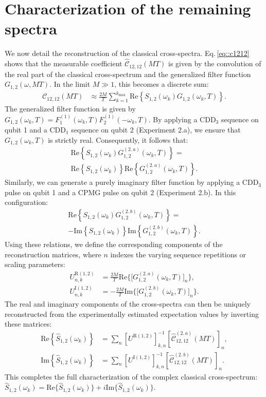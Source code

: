 \documentclass[%
 reprint,
superscriptaddress,
 amsmath,amssymb,
 aps,
pra,
floatfix,
]{revtex4-2}
\begin{document}
\section{Characterization of the remaining spectra}
\label{app::char}
We now detail the reconstruction of the classical cross-spectra. Eq.\,\eqref{eq::c1212} shows that the measurable coefficient $\hat{\mathcal{C}}_{12,12}(MT)$ is given by the convolution of the real part of the classical cross-spectrum and the generalized filter function $G_{1,2}(\omega, MT)$. In the limit $M\gg 1$, this becomes a discrete sum:
\begin{align}
    \mathcal{C}_{12,12}(MT)&\approx\frac{2M}{T}\sum_{k=1}^{k_{\max}}\text{Re}\left\{S_{1,2}(\omega_k)G_{1,2}(\omega_k, T)\right\}.
\end{align}
The generalized filter function is given by $G_{1,2}(\omega_k, T)=F_1^{(1)}(\omega_k, T)F_2^{(1)}(-\omega_k, T)$. By applying a $\text{CDD}_3$ sequence on qubit 1 and a $\text{CDD}_1$ sequence on qubit 2 (Experiment 2.a), we ensure that $G_{1,2}(\omega_k, T)$ is strictly real. Consequently, it follows that:
\begin{multline}
    \text{Re}\left\{S_{1,2}(\omega_k)G_{1,2}^{(2.\,a)}(\omega_k, T)\right\} = \\
    \text{Re}\left\{S_{1,2}(\omega_k)\right\}\text{Re}\left\{G_{1,2}^{(2.\,a)}(\omega_k, T)\right\}.
\end{multline}
Similarly, we can generate a purely imaginary filter function by applying a $\text{CDD}_3$ pulse on qubit 1 and a CPMG pulse on qubit 2 (Experiment 2.b). In this configuration:
\begin{multline}
    \text{Re}\left\{S_{1,2}(\omega_k)G_{1,2}^{(2.\,b)}(\omega_k, T)\right\} =\\
    -\text{Im}\left\{S_{1,2}(\omega_k)\right\}\text{Im}\left\{G_{1,2}^{(2.\,b)}(\omega_k, T)\right\}.
\end{multline}
Using these relations, we define the corresponding components of the reconstruction matrices, where $n$ indexes the varying sequence repetitions or scaling parameters:
\begin{align}
    U_{n,k}^{\text{R}(1,2)}&=\frac{2M}{T}\text{Re}\Big\{\big[G_{1,2}^{(2.\,a)}(\omega_k, T)\big]_n\Big\},\\
    U_{n,k}^{\text{I}(1,2)}&=-\frac{2M}{T}\text{Im}\Big\{\big[G_{1,2}^{(2.\,b)}(\omega_k, T)\big]_n\Big\}.
\end{align}
The real and imaginary components of the cross-spectra can then be uniquely reconstructed from the experimentally estimated expectation values by inverting these matrices:
\begin{align}
    \text{Re}\left\{\hat{S}_{1,2}(\omega_k)\right\} &= \sum_n\left[U^{\text{R}(1,2)}\right]^{-1}_{k,n}\left[\hat{\mathcal{C}}^{(2.\,a)}_{12,12}(MT)\right]_n,\\
    \text{Im}\left\{\hat{S}_{1,2}(\omega_k)\right\} &= \sum_n\left[U^{\text{I}(1,2)}\right]^{-1}_{k,n}\left[\hat{\mathcal{C}}^{(2.\,b)}_{12,12}(MT)\right]_n.
\end{align}
This completes the full characterization of the complex classical cross-spectrum: $\hat{S}_{1,2}(\omega_k)=\text{Re}\{\hat{S}_{1,2}(\omega_k)\}+i\text{Im}\{\hat{S}_{1,2}(\omega_k)\}$.
\end{document}

